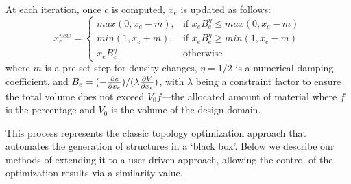 
At each iteration, once $c$ is computed, $x_e$ is updated as follows:
\begin{equation}
	x_e^{new} = 
	\begin{cases}
    max(0, x_e-m),	& \text{if } x_eB_e^\eta \leq max(0, x_e-m) \\
    min(1, x_e+m),  & \text{if } x_eB_e^\eta \geq min(1, x_e-m) \\
    x_eB_e^\eta 	& \text{otherwise}
	\end{cases}
\end{equation}
where $m$ is a pre-set step for density changes, $\eta = 1/2$ is a numerical damping coefficient, and $B_e = (-{\partial c \over \partial x_e})/(\lambda{\partial V \over \partial x_e})$, with $\lambda$ being a constraint factor to ensure the total volume does not exceed $V_0f$---the allocated amount of material where $f$ is the percentage and $V_0$ is the volume of the design domain.


This process represents the classic topology optimization approach that automates the generation of structures in a `black box'. Below we describe our methods of extending it to a user-driven approach, allowing the control of the optimization results via a similarity value.


